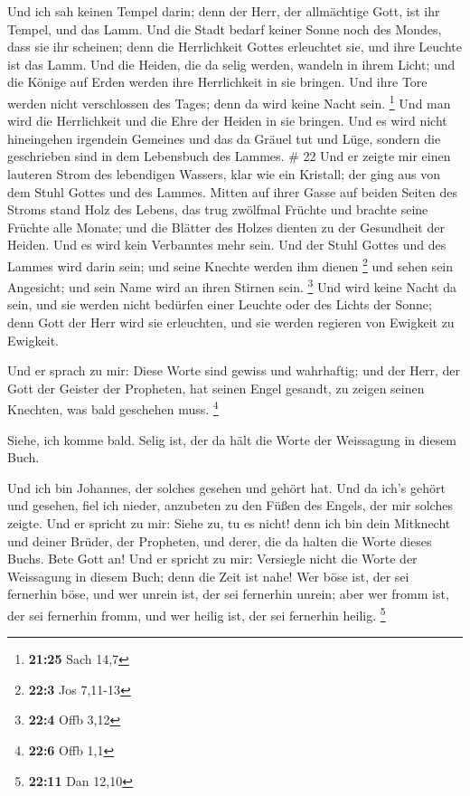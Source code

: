  Und ich sah keinen Tempel darin; denn der Herr, der
allmächtige Gott, ist ihr Tempel, und das Lamm.  Und die
Stadt bedarf keiner Sonne noch des Mondes, dass sie ihr scheinen; denn
die Herrlichkeit Gottes erleuchtet sie, und ihre Leuchte ist das Lamm.
 Und die Heiden, die da selig werden, wandeln in ihrem
Licht; und die Könige auf Erden werden ihre Herrlichkeit in sie bringen.
 Und ihre Tore werden nicht verschlossen des Tages; denn
da wird keine Nacht sein. \footnote{\textbf{21:25} Sach 14,7}
 Und man wird die Herrlichkeit und die Ehre der Heiden in
sie bringen.  Und es wird nicht hineingehen irgendein
Gemeines und das da Gräuel tut und Lüge, sondern die geschrieben sind in
dem Lebensbuch des Lammes. \# 22  Und er zeigte mir einen
lauteren Strom des lebendigen Wassers, klar wie ein Kristall; der ging
aus von dem Stuhl Gottes und des Lammes.  Mitten auf ihrer
Gasse auf beiden Seiten des Stroms stand Holz des Lebens, das trug
zwölfmal Früchte und brachte seine Früchte alle Monate; und die Blätter
des Holzes dienten zu der Gesundheit der Heiden.  Und es
wird kein Verbanntes mehr sein. Und der Stuhl Gottes und des Lammes wird
darin sein; und seine Knechte werden ihm dienen \footnote{\textbf{22:3}
  Jos 7,11-13}  und sehen sein Angesicht; und sein Name
wird an ihren Stirnen sein. \footnote{\textbf{22:4} Offb 3,12}
 Und wird keine Nacht da sein, und sie werden nicht
bedürfen einer Leuchte oder des Lichts der Sonne; denn Gott der Herr
wird sie erleuchten, und sie werden regieren von Ewigkeit zu Ewigkeit.

 Und er sprach zu mir: Diese Worte sind gewiss und
wahrhaftig; und der Herr, der Gott der Geister der Propheten, hat seinen
Engel gesandt, zu zeigen seinen Knechten, was bald geschehen muss.
\footnote{\textbf{22:6} Offb 1,1}

 Siehe, ich komme bald. Selig ist, der da hält die Worte
der Weissagung in diesem Buch.

 Und ich bin Johannes, der solches gesehen und gehört hat.
Und da ich's gehört und gesehen, fiel ich nieder, anzubeten zu den Füßen
des Engels, der mir solches zeigte.  Und er spricht zu
mir: Siehe zu, tu es nicht! denn ich bin dein Mitknecht und deiner
Brüder, der Propheten, und derer, die da halten die Worte dieses Buchs.
Bete Gott an!  Und er spricht zu mir: Versiegle nicht die
Worte der Weissagung in diesem Buch; denn die Zeit ist nahe!
 Wer böse ist, der sei fernerhin böse, und wer unrein
ist, der sei fernerhin unrein; aber wer fromm ist, der sei fernerhin
fromm, und wer heilig ist, der sei fernerhin heilig. \footnote{\textbf{22:11}
  Dan 12,10}

